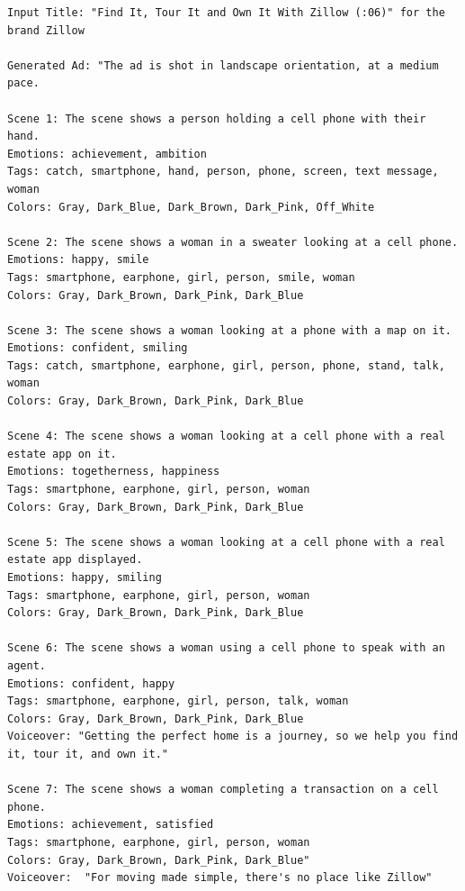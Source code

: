 \begin{lstlisting}[caption={Advertisement generated by Henry-SEED for a Zillow ad. Original Ad: \url{https://www.youtube.com/watch?v=P6gydrvTkaA}},frame=single,breaklines=true,basicstyle=\tiny, label={lst:zillow}]
Input Title: "Find It, Tour It and Own It With Zillow (:06)" for the brand Zillow

Generated Ad: "The ad is shot in landscape orientation, at a medium pace.

Scene 1: The scene shows a person holding a cell phone with their hand.
Emotions: achievement, ambition
Tags: catch, smartphone, hand, person, phone, screen, text message, woman
Colors: Gray, Dark_Blue, Dark_Brown, Dark_Pink, Off_White

Scene 2: The scene shows a woman in a sweater looking at a cell phone.
Emotions: happy, smile
Tags: smartphone, earphone, girl, person, smile, woman
Colors: Gray, Dark_Brown, Dark_Pink, Dark_Blue

Scene 3: The scene shows a woman looking at a phone with a map on it.
Emotions: confident, smiling
Tags: catch, smartphone, earphone, girl, person, phone, stand, talk, woman
Colors: Gray, Dark_Brown, Dark_Pink, Dark_Blue

Scene 4: The scene shows a woman looking at a cell phone with a real estate app on it.
Emotions: togetherness, happiness
Tags: smartphone, earphone, girl, person, woman
Colors: Gray, Dark_Brown, Dark_Pink, Dark_Blue

Scene 5: The scene shows a woman looking at a cell phone with a real estate app displayed.
Emotions: happy, smiling
Tags: smartphone, earphone, girl, person, woman
Colors: Gray, Dark_Brown, Dark_Pink, Dark_Blue

Scene 6: The scene shows a woman using a cell phone to speak with an agent.
Emotions: confident, happy
Tags: smartphone, earphone, girl, person, talk, woman
Colors: Gray, Dark_Brown, Dark_Pink, Dark_Blue
Voiceover: "Getting the perfect home is a journey, so we help you find it, tour it, and own it."

Scene 7: The scene shows a woman completing a transaction on a cell phone.
Emotions: achievement, satisfied
Tags: smartphone, earphone, girl, person, woman
Colors: Gray, Dark_Brown, Dark_Pink, Dark_Blue"
Voiceover:  "For moving made simple, there's no place like Zillow"
\end{lstlisting}

